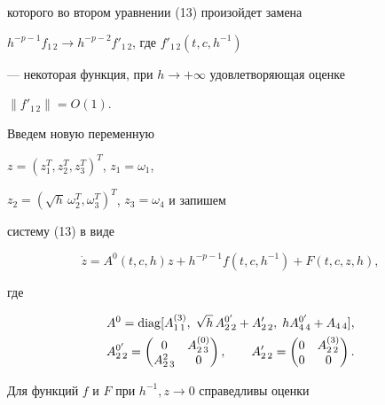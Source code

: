 \begin{pf}
которого во втором уравнении (13) произойдет замена 


$h^{-p-1}f_{1\,2}\to h^{-p-2}f'_{1\,2}$, где $f'_{1\,2}(t,c,h^{-1})$ 


--- некоторая функция, при $h\to+\infty$ удовлетворяющая оценке 


$\|f'_{1\,2}\|=O(1)$. 


 


Введем новую переменную 


$z=(z^T_1,z^T_2,z^T_3)^T$, $z_1=\omega_1$, 


$z_2=(\sqrt{h}\,\omega^T_2,\omega^T_3)^T$, $z_3=\omega_4$ и запишем 


систему (13) в виде 


\begin{equation} 


\Dot z=A^0(t,c,h)z+h^{-p-1}f(t,c,h^{-1})+ 


F(t,c,z,h), 


\end{equation} 


где 


\begin{gather*} 


A^0=\diag[A^{(3)}_{1\,1},\; \sqrt{h}\,A^{0'}_{2\,2}+ 


A'_{2\,2},\;h A^{0'}_{4\,4}+A_{4\,4}], \\ 


A^{0'}_{2\,2}= 


\begin{pmatrix} 


0 & A^{(0)}_{2\,3} \\ A^2_{2\,3} & 0 


\end{pmatrix} 


,\qquad 


A'_{2\,2}= 


\begin{pmatrix} 


0 & A^{(3)}_{2\,2} \\ 0 & 0 


\end{pmatrix} 


. 


\end{gather*} 


 


Для функций $f$ и $F$ при $h^{-1},z\to 0$ справедливы оценки 



\end{pf}
